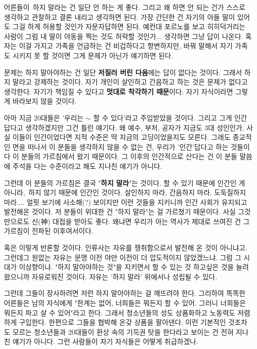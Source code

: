 \vspace{5mm}

어른들이 하지 말라는 건 일단 안 하는 게 좋다. 그리고 왜 하면 안 되는 건가 스스로 생각하고 관찰하고 결론 내리고 생각하면 된다.
가장 간단한 건 자기의 아들 딸이 있어도 그걸 하게 허용할 것인가 자문자답하면 된다.
예컨대 포르노를 보고 히히덕거리는 사람이 그럼 내 딸이 야동을 찍는 것도 허락할 것인가... 생각하면 그냥 답이 나온다.
혹자는 이걸 가지고 가족을 언급하는 건 비겁하다고 항변하지만, 바꿔 말해서 자기 가족도 시키지 못 할 것이면 그게 문제가 아닌가 얘기하면 된다.
\vspace{5mm}

문제는 하지 말아야하는 건 일단 \textbf{저질러 버린 다음}에는 답이 없다는 것이다. 그래서 하지 말라고 강제하는 것이다.
자기 개인이 살인하고 간음하고 하는 것은 문제가 없다고 생각한다. 자기가 책임질 수 있다고 \textbf{멋대로 착각하기 때문}이다.
자기 자식이라면 그렇게 바라보지 않을 것이다.
\vspace{5mm}

아마 지금 20대들은 '우리는 $\sim$ 할 수 있다'라고 주입받았을 것이다. 그리고 그게 인간답다고 생각하겠지만 그건 틀린 얘기다.
왜 예수, 부처, 공자가 지금도 3대 성인인가. 사실 이들이 인간이었다면 지적 수준은 딱 지금의 고딩이었을지도 모른다.
그래도 종교적인 면을 떠나서 이 분들을 생각하지 않을 수 없는 건, 우리가 '인간'답다고 하는 것들이 다 이 분들의 가르침에서 왔기 때문이다.
그 이후의 인간적으로 산다는 건 이 분들 말씀에 주석을 다는 수준이라고 해도 지나친 얘기가 아니다.
\vspace{5mm}

그런데 이 분들의 가르침은 결국 "\textbf{하지 말라}"는 것이다.
할 수 있기 때문에 인간인 게 아니라, 하지 않기 때문에 인간인 것이다.
살인하지 마라, 간음하지 마라, 도둑질하지 마라.... 얼핏 보기에 사소해(?) 보이지만 이런 것들을 지키니까 인간 사회가 유지되고 발전해온 것이다.
저 분들이 위대한 건 "하지 말라"는 걸 가르쳤기 때문이다.
사실 그것만으로도 신(神) 대접을 받아도 좋다. 왜냐면 우리가 아는 역사가 제대로 쓰여진 건 그 가르침이 전파된 이후여서이다.
\vspace{5mm}

혹은 이렇게 반론할 것이다. 인류사는 자유를 쟁취함으로서 발전해 온 것이 아니냐고.
그런데그 원없는 자유는 문명 이전 야만 이전이 더 압도적이지 않았겠느냐. 그럼 그 시대가 이상향이냐.
"하지 말아야하는 것"을 지키면서 할 수 있는 것 하고싶은 것을 늘려왔으니까 자유로워진 것이다.
자유는 '하지 말라' 위에서나 성립될 수 있다.
\vspace{5mm}

그런데 그들이 장사하려면 저런 하지 말아야하는 걸 깨뜨려야 한다.
그리하여 똑똑한 어른들은 남의 자식에게 "한계는 없어, 너희들은 뭐든지 할 수 있어. 그러니 너희들은 뭐든지 파고 살 수 있어"라고 한다.
그래서 청소년들의 성도 상품화하고 노동력도 저렴하게 구입한다. 한편으로 그들을 협박해 온갖 상품을 팔아댄다.
이런 기본적인 것조차도 모르는 청소년들과 20대들이 환상 속의 기득권 탓을 한다라고 보이는 건 전혀 지나친 얘기가 아니다.
그런 사람들이 자기 자식들은 어떻게 취급하겠나.
\vspace{5mm}

